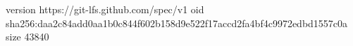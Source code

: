 version https://git-lfs.github.com/spec/v1
oid sha256:daa2c84add0aa1b0c844f602b158d9e522f17accd2fa4bf4c9972edbd1557c0a
size 43840

